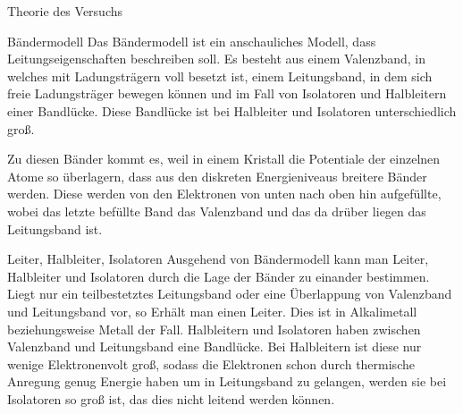 \documentclass[pdftex, a4paper,11pt, twoside, ngerman]{report}
\begin{document}
  
  
  
  
  
  
  
  
  
  \tableofcontents
  
  
  
  \begin{chapter}{Theorie des Versuchs}
    \label{chp:Theorie}
   
   
        \begin{section}{Bändermodell}
            Das Bändermodell ist ein anschauliches Modell, dass Leitungseigenschaften beschreiben soll. 
            Es besteht aus einem Valenzband, in welches mit Ladungsträgern voll besetzt ist, einem Leitungsband, in dem sich freie Ladungsträger bewegen können und im Fall von Isolatoren und Halbleitern einer Bandlücke.
            Diese Bandlücke ist bei Halbleiter und Isolatoren unterschiedlich groß.

            Zu diesen Bänder kommt es, weil in einem Kristall die Potentiale der einzelnen Atome so überlagern, dass aus den diskreten Energieniveaus breitere Bänder werden.
            Diese werden von den Elektronen von unten nach oben hin aufgefüllte, wobei das letzte befüllte Band das Valenzband und das da drüber liegen das Leitungsband ist.
            
        \end{section}

        \begin{section}{Leiter, Halbleiter, Isolatoren}
            Ausgehend von Bändermodell kann man Leiter, Halbleiter und Isolatoren durch die Lage der Bänder zu einander bestimmen.
            Liegt nur ein teilbestetztes Leitungsband oder eine Überlappung von Valenzband und Leitungsband vor, so Erhält man einen Leiter.
            Dies ist in Alkalimetall beziehungsweise Metall der Fall.
            Halbleitern und Isolatoren haben zwischen Valenzband und Leitungsband eine Bandlücke. 
            Bei Halbleitern ist diese nur wenige Elektronenvolt groß, sodass die Elektronen schon durch thermische Anregung genug Energie haben um in Leitungsband zu gelangen, werden sie bei Isolatoren so groß ist, das dies nicht leitend werden können.
            

\end{section}
\end{chapter}
\end{document}
